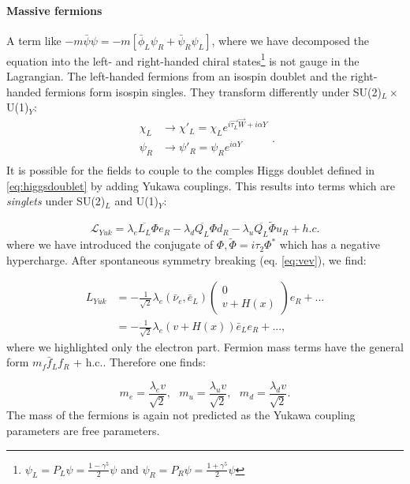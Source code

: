 \paragraph{Massive fermions}
A term like $-m\bar{\psi}\psi = -m\left[\bar{\phi}_L\psi_R + \bar{\psi}_R\psi_L\right]$, where we have decomposed the equation into the left- and right-handed chiral states\footnote{$\psi_L = P_L \psi = \frac{1-\gamma^5}{2} \psi$ and $\psi_R = P_R \psi = \frac{1+\gamma^5}{2} \psi$} is not gauge in the Lagrangian. The left-handed fermions from an isospin doublet and the right-handed fermions form isospin singles. They transform differently under SU(2)$_L \times$ U(1)$_Y$:
\begin{equation}
\begin{split}
\chi_L &\rightarrow \chi'_L = \chi_L e^{i \vec{\tau_L} \vec{W}+i\alpha Y}\\
\psi_R &\rightarrow \psi'_R = \psi_R e^{i\alpha Y}\\
\end{split}.
\end{equation} 
It is possible for the fields to couple to the comples Higgs doublet defined in \ref{eq:higgsdoublet} by adding Yukawa couplings. This results into terms which are \textit{singlets} under SU(2)$_L$ and U(1)$_Y$:

\begin{equation}
\label{eq:yukawa}
\mathcal{L}_{Yuk} = \lambda_e \overline{L_L}\Phi e_R - \lambda_d \overline{Q_L} \Phi d_R - \lambda_u \overline{Q_L} \tilde{\Phi}u_R + h.c.
\end{equation}
where we have introduced the conjugate of $\Phi,\tilde{\Phi} = i\tau_2 \Phi^*$ which has a negative hypercharge. After spontaneous symmetry breaking (eq. \ref{eq:vev}), we find:

\begin{equation}
\begin{split}
L_{Yuk} &= -\frac{1}{\sqrt{2}} \lambda_e \left(\bar{\nu}_e, \bar{e}_L\right) \begin{pmatrix} 0 \\ v+H(x) \end{pmatrix} e_R + ... \\
\ &= -\frac{1}{\sqrt{2}} \lambda_e \left(v+H(x)\right)\bar{e}_L e_R + ...,
\end{split}
\end{equation}
where we highlighted only the electron part. Fermion mass terms have the general form $m_f \bar{f}_L f_R$ + h.c.. Therefore one finds:

\begin{equation}
m_e = \frac{\lambda_e v}{\sqrt{2}}, \ \ \ m_u = \frac{\lambda_u v}{\sqrt{2}}, \ \ \ m_d = \frac{\lambda_d v}{\sqrt{2}}.
\end{equation}
The mass of the fermions is again not predicted as the Yukawa coupling parameters are free parameters. 

